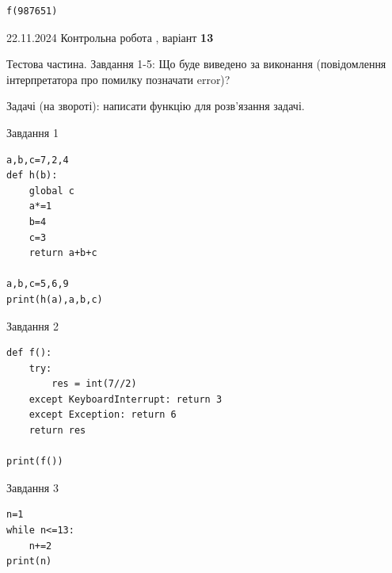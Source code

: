 \documentclass[12pt, ukrainian]{article}
\begin{document}
{{{{{{{{{{{{\begin{minipage}[t]{10.7cm}
\begin{verbatim}
f(987651)
\end{verbatim}


\end{minipage}

\newpage

{{22.11.2024 Контрольна робота , варіант  \No \textbf { 13 }\par}}
{

Тестова частина. Завдання 1-5: Що буде виведено за виконання (повідомлення інтерпретатора про помилку позначати error)?

Задачі (на звороті): написати функцію для розв'язання задачі.

\vspace{5mm} \begin{minipage}[t]{8.5cm}
               
{\begin{center}Завдання {1}\end{center}}
\vspace{-6mm}

\begin{verbatim}
a,b,c=7,2,4
def h(b):
    global c
    a*=1
    b=4
    c=3
    return a+b+c

a,b,c=5,6,9
print(h(a),a,b,c)
\end{verbatim}


\vspace{5mm}
               
{\begin{center}Завдання {2}\end{center}}
\vspace{-6mm}

\begin{verbatim}
def f():
    try:
        res = int(7//2)
    except KeyboardInterrupt: return 3
    except Exception: return 6
    return res

print(f())
\end{verbatim}


\vspace{5mm}
               
{\begin{center}Завдання {3}\end{center}}
\vspace{-6mm}

\begin{verbatim}
n=1
while n<=13:
    n+=2
print(n)
\end{verbatim}


\end{minipage}
\vline \hspace{6mm}
\begin{minipage}[t]{10.7cm}
               

\end{minipage}}}}}}}}}}}}}}
\end{document}
